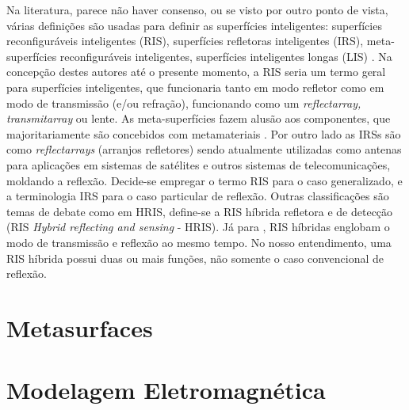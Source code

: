 \documentclass[
	12pt,				%
	openright,			%
	oneside,			%
	a4paper,			%
	english,			%
	brazil				%
	]{abntex2}
\begin{document}
Na literatura, parece não haver consenso, ou se visto por outro ponto de vista, várias definições são usadas para definir as superfícies inteligentes: superfícies reconfiguráveis inteligentes (RIS), superfícies refletoras inteligentes (IRS), meta-superfícies reconfiguráveis inteligentes, superfícies inteligentes longas (LIS) \cite{SDNRIS} . Na concepção destes autores até o presente momento, a RIS seria um termo geral para superfícies inteligentes, que funcionaria tanto em modo refletor como em modo de transmissão (e/ou refração), funcionando como um \textit{reflectarray, transmitarray }ou lente. As meta-superfícies fazem alusão aos componentes, que majoritariamente são concebidos com metamateriais \cite{SREMetasurface}. Por outro lado as IRSs são como \textit{reflectarrays} (arranjos refletores) sendo atualmente utilizadas como antenas para aplicações em sistemas de satélites e outros sistemas de telecomunicações, moldando a reflexão. Decide-se empregar o termo RIS para o caso generalizado, e a terminologia IRS para o caso particular de reflexão. Outras classificações são temas de debate como em HRIS, define-se a RIS híbrida refletora e de detecção (RIS \textit{Hybrid reflecting and sensing} - HRIS). Já para \cite{CFGOBDRIS}, RIS híbridas englobam o modo de transmissão e reflexão ao mesmo tempo. No nosso entendimento, uma RIS híbrida possui duas ou mais funções, não somente o caso convencional de reflexão. 

\section{Metasurfaces}\label{TeoriaMetasurfaces}





\section{Modelagem Eletromagnética}\label{FormulaçãoPWTLBalanis}
\end{document}

